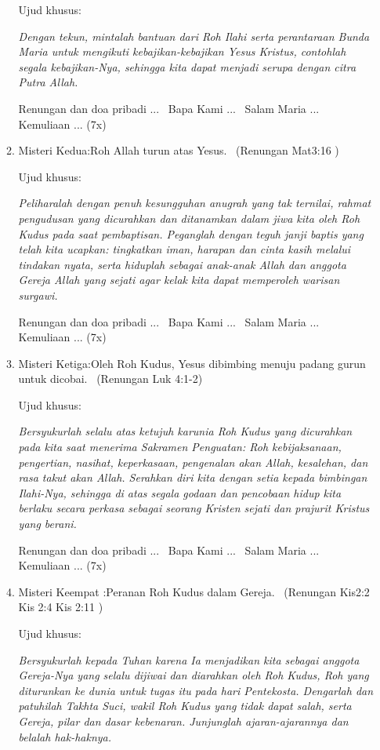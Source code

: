 \begin{enumerate}
\begin{enumerate}
Ujud khusus:~

\textit{Dengan tekun, mintalah bantuan dari Roh Ilahi serta perantaraan Bunda
Maria untuk mengikuti kebajikan-kebajikan Yesus Kristus, contohlah
segala kebajikan-Nya, sehingga kita dapat menjadi serupa dengan citra
Putra Allah.}

Renungan dan doa pribadi ...~ Bapa Kami ...~ Salam Maria ...~ Kemuliaan
... (7x)

\item Misteri Kedua:{\textquotedbl}Roh Allah turun atas Yesus.{\textquotedbl}~
(Renungan Mat3:16 )

Ujud khusus:~

\textit{Peliharalah dengan penuh kesungguhan anugrah yang tak ternilai, rahmat
pengudusan yang dicurahkan dan ditanamkan dalam jiwa kita oleh Roh
Kudus pada saat pembaptisan. Peganglah dengan teguh janji baptis yang
telah kita ucapkan: tingkatkan iman, harapan dan cinta kasih melalui
tindakan nyata, serta hiduplah sebagai anak-anak Allah dan anggota
Gereja Allah yang sejati agar kelak kita dapat memperoleh warisan
surgawi.}

Renungan dan doa pribadi ...~ Bapa Kami ...~ Salam Maria ...~ Kemuliaan
... (7x)

\item Misteri Ketiga:{\textquotedbl}Oleh Roh Kudus, Yesus dibimbing menuju
padang gurun untuk dicobai.{\textquotedbl}~ (Renungan Luk 4:1-2)

Ujud khusus:~

\textit{Bersyukurlah selalu atas ketujuh karunia Roh Kudus yang dicurahkan pada
kita saat menerima Sakramen Penguatan: Roh kebijaksanaan, pengertian,
nasihat, keperkasaan, pengenalan akan Allah, kesalehan, dan rasa takut
akan Allah. Serahkan diri kita dengan setia kepada bimbingan Ilahi-Nya,
sehingga di atas segala godaan dan pencobaan hidup kita berlaku secara
perkasa sebagai seorang Kristen sejati dan prajurit Kristus yang
berani.}

Renungan dan doa pribadi ...~ Bapa Kami ...~ Salam Maria ...~ Kemuliaan
... (7x)

\item Misteri Keempat :{\textquotedbl}Peranan Roh Kudus dalam
Gereja.{\textquotedbl}~ (Renungan Kis2:2 Kis 2:4 Kis 2:11 )

Ujud khusus:~

\textit{Bersyukurlah kepada Tuhan karena Ia menjadikan kita sebagai anggota
Gereja-Nya yang selalu dijiwai dan diarahkan oleh Roh Kudus, Roh yang
diturunkan ke dunia untuk tugas itu pada hari Pentekosta. Dengarlah dan
patuhilah Takhta Suci, wakil Roh Kudus yang tidak dapat salah, serta
Gereja, pilar dan dasar kebenaran. Junjunglah ajaran-ajarannya dan
belalah hak-haknya.}


\end{enumerate}
\end{enumerate}
